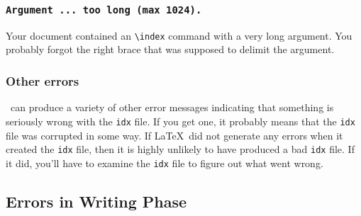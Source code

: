 %
%
%
%
%
 
\subsubsection*{\tt Argument ... too long (max 1024).}
 
Your document contained an \verb|\index| command with a very long
argument.  You probably forgot the right brace that was supposed
to delimit the argument.
 
\subsubsection*{Other errors}
 
\MakeIndex\ can produce a variety of other error messages indicating
that something is seriously wrong with the {\tt idx} file.  If you
get one, it probably means that the {\tt idx} file was corrupted in
some way.  If \LaTeX\ did not generate any errors when it created
the {\tt idx} file, then it is highly unlikely to have produced
a bad {\tt idx} file.  If it did, you'll have to examine the
{\tt idx} file to figure out what went wrong.
 
 
\subsection{Errors in Writing Phase}
 
